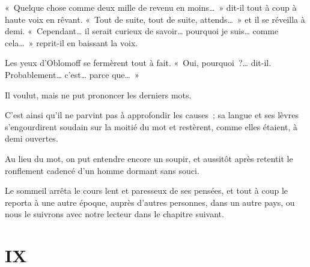 \documentclass[french,twoside]{book} %
\begin{document}
« Quelque chose comme deux mille de revenu en moins… » dit-il tout à coup à haute voix en rêvant. « Tout de suite, tout de suite, attends… » et il se réveilla à demi. « Cependant… il serait curieux de savoir… pourquoi je suis… comme cela… » reprit-il en baissant la voix.\par
Les yeux d’Oblomoff se fermèrent tout à fait. « Oui, pourquoi ?… dit-il. Probablement… c’est… parce que… »\par
Il voulut, mais ne put prononcer les derniers mots.\par
C’est ainsi qu’il ne parvint pas à approfondir les causes ; sa langue et ses lèvres s’engourdirent soudain sur la moitié du mot et restèrent, comme elles étaient, à demi ouvertes.\par
Au lieu du mot, on put entendre encore un soupir, et aussitôt après retentit le ronflement cadencé d’un homme dormant sans souci.\par
Le sommeil arrêta le cours lent et paresseux de ses pensées, et tout à coup le reporta à une autre époque, auprès d’autres personnes, dans un autre pays, ou nous le suivrons avec notre lecteur dans le chapitre suivant.
\section[{IX}]{IX}\renewcommand{\leftmark}{IX}
\end{document}
